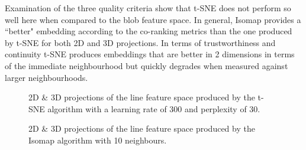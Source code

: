Examination of the three quality criteria show that t-SNE does not perform so well here when compared to the blob feature space. In general, Isomap provides a ``better" embedding according to the co-ranking metrics than the one produced by t-SNE for both 2D and 3D projections. In terms of trustworthiness and continuity t-SNE produces embeddings that are better in 2 dimensions in terms of the immediate neighbourhood but quickly degrades when measured against larger neighbourhoods.

\begin{figure}[H]
	\centering
	\caption{2D \& 3D projections of the line feature space produced by the t-SNE algorithm with a learning rate of 300 and perplexity of 30.}\label{fig:line_SNE_mapping}
\end{figure}

\begin{figure}[H]
	\centering
	\caption{2D \& 3D projections of the line feature space  produced by the Isomap algorithm with 10 neighbours.}\label{fig:line_iso_mapping}
\end{figure}

